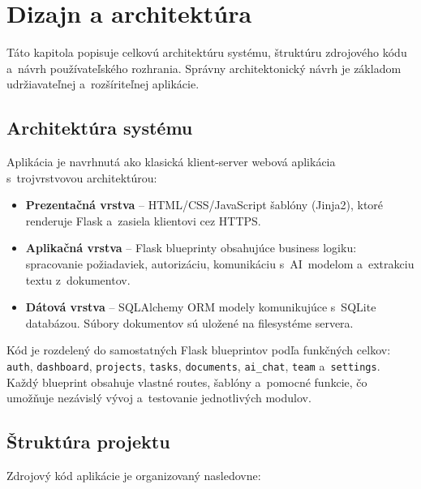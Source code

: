 \chapter{Dizajn a architektúra}

        Táto kapitola popisuje celkovú architektúru systému, štruktúru zdrojového kódu
a~návrh používateľského rozhrania. Správny architektonický návrh je základom udržiavateľnej
a~rozšíriteľnej aplikácie.

\section{Architektúra systému}

        Aplikácia je navrhnutá ako klasická klient-server webová aplikácia s~trojvrstvovou
architektúrou:

\begin{itemize}
  \item \textbf{Prezentačná vrstva} -- HTML/CSS/JavaScript šablóny (Jinja2), ktoré
        renderuje Flask a~zasiela klientovi cez HTTPS.
  \item \textbf{Aplikačná vrstva} -- Flask blueprinty obsahujúce business logiku:
        spracovanie požiadaviek, autorizáciu, komunikáciu s~AI~modelom a~extrakciu
        textu z~dokumentov.
  \item \textbf{Dátová vrstva} -- SQLAlchemy ORM modely komunikujúce s~SQLite
        databázou. Súbory dokumentov sú uložené na filesystéme servera.
\end{itemize}

        Kód je rozdelený do samostatných Flask blueprintov podľa funkčných celkov:
\texttt{auth}, \texttt{dashboard}, \texttt{projects}, \texttt{tasks}, \texttt{documents},
\texttt{ai\_chat}, \texttt{team} a~\texttt{settings}. Každý blueprint obsahuje vlastné
routes, šablóny a~pomocné funkcie, čo umožňuje nezávislý vývoj a~testovanie jednotlivých
modulov.

\section{Štruktúra projektu}

        Zdrojový kód aplikácie je organizovaný nasledovne:

